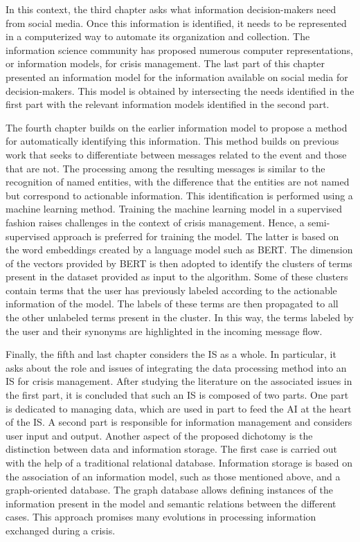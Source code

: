 In this context, the third chapter asks what information decision-makers need from social media.
Once this information is identified, it needs to be represented in a computerized way to automate its organization and collection.
The information science community has proposed numerous computer representations, or information models, for crisis management.
The last part of this chapter presented an information model for the information available on social media for decision-makers.
This model is obtained by intersecting the needs identified in the first part with the relevant information models identified in the second part.

The fourth chapter builds on the earlier information model to propose a method for automatically identifying this information.
This method builds on previous work that seeks to differentiate between messages related to the event and those that are not.
The processing among the resulting messages is similar to the recognition of named entities, with the difference that the entities are not named but correspond to actionable information.
This identification is performed using a machine learning method.
Training the machine learning model in a supervised fashion raises challenges in the context of crisis management.
Hence, a semi-supervised approach is preferred for training the model.
The latter is based on the word embeddings created by a language model such as BERT.
The dimension of the vectors provided by BERT is then adopted to identify the clusters of terms present in the dataset provided as input to the algorithm.
Some of these clusters contain terms that the user has previously labeled according to the actionable information of the model.
The labels of these terms are then propagated to all the other unlabeled terms present in the cluster.
In this way, the terms labeled by the user and their synonyms are highlighted in the incoming message flow.

Finally, the fifth and last chapter considers the IS as a whole.
In particular, it asks about the role and issues of integrating the data processing method into an IS for crisis management.
After studying the literature on the associated issues in the first part, it is concluded that such an IS is composed of two parts.
One part is dedicated to managing data, which are used in part to feed the AI at the heart of the IS.
A second part is responsible for information management and considers user input and output.
Another aspect of the proposed dichotomy is the distinction between data and information storage.
The first case is carried out with the help of a traditional relational database.
Information storage is based on the association of an information model, such as those mentioned above, and a graph-oriented database.
The graph database allows defining instances of the information present in the model and semantic relations between the different cases.
This approach promises many evolutions in processing information exchanged during a crisis.

